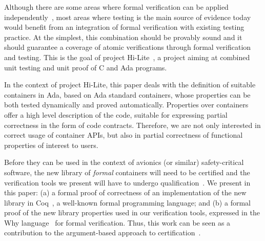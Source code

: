 \documentclass[runningheads,a4paper]{llncs}
\newcommand{\eg}{\textit{e.g.,}\xspace}
\begin{document}
Although there are some areas where formal verification can be applied
independently~\cite{souyris:2009:fm}, most areas where testing is the main
source of evidence today would benefit from an integration of formal
verification with existing testing practice. At the simplest, this
combination should be provably sound and it should guarantee a coverage of
atomic verifications through formal verification and testing. This is the goal
of project Hi-Lite~\cite{hilite}, a project aiming at combined unit testing and unit proof of
C and Ada programs.

In the context of project Hi-Lite, this paper deals with the definition of
suitable containers in Ada, based on Ada standard containers, whose properties
can be both tested dynamically and proved automatically. Properties
over containers offer a high level description of the code,
suitable for expressing partial correctness in the form of code contracts. Therefore, we
are not only interested in correct usage of container APIs, but also in partial
correctness of functional properties of interest to users.

Before they can be used in the context of avionics (or similar) safety-critical
software, the new library of \textit{formal} containers will need to be certified
and the verification tools we present will have to undergo
qualification~\cite{standard:do-178b}. We present in this paper: (a) a formal
proof of correctness of an implementation of the new library in Coq~\cite{coq}, a
well-known formal programming language; and (b) a formal proof of the new
library properties used in our verification tools, expressed in the Why
language~\cite{why} for formal verification. Thus, this work can be seen as a contribution
to the argument-based approach to certification~\cite{rushby:2010:sss}.
\end{document}
